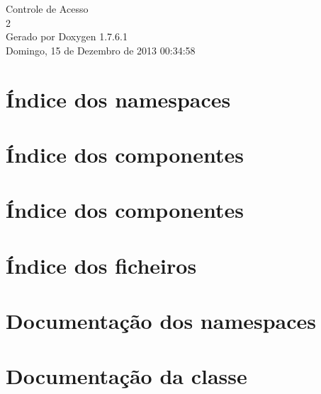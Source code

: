 \documentclass[a4paper]{book}
\begin{document}
\hypersetup{pageanchor=false,citecolor=blue}
\begin{titlepage}
\vspace*{7cm}
\begin{center}
{\Large \-Controle de \-Acesso \\[1ex]\large 2 }\\
\vspace*{1cm}
{\large \-Gerado por Doxygen 1.7.6.1}\\
\vspace*{0.5cm}
{\small Domingo, 15 de Dezembro de 2013 00:34:58}\\
\end{center}
\end{titlepage}
\clearemptydoublepage
{}
\tableofcontents
\clearemptydoublepage
{}
\hypersetup{pageanchor=true,citecolor=blue}
\chapter{Índice dos namespaces}

\chapter{Índice dos componentes}

\chapter{Índice dos componentes}

\chapter{Índice dos ficheiros}

\chapter{\-Documentação dos namespaces}











\chapter{\-Documentação da classe}

















\end{document}
